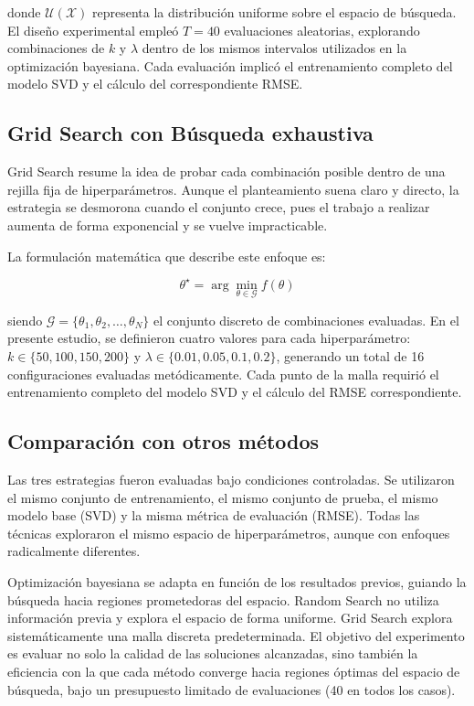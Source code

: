 \documentclass[twocolumn,10pt]{article}
\begin{document}
donde \(\mathcal{U}(\mathcal{X})\) representa la distribución uniforme sobre el espacio de búsqueda. El diseño experimental empleó \(T = 40\) evaluaciones aleatorias, explorando combinaciones de \(k\) y \(\lambda\) dentro de los mismos intervalos utilizados en la optimización bayesiana. Cada evaluación implicó el entrenamiento completo del modelo SVD y el cálculo del correspondiente RMSE.

\subsection{Grid Search con Búsqueda exhaustiva}

Grid Search resume la idea de probar cada combinación posible dentro de una rejilla fija de hiperparámetros. Aunque el planteamiento suena claro y directo, la estrategia se desmorona cuando el conjunto crece, pues el trabajo a realizar aumenta de forma exponencial y se vuelve impracticable.

La formulación matemática que describe este enfoque es:

\[
\theta^\star = \arg\min_{\theta \in \mathcal{G}} f(\theta)
\]

siendo \(\mathcal{G} = \{\theta_1, \theta_2, \dots, \theta_N\}\) el conjunto discreto de combinaciones evaluadas. En el presente estudio, se definieron cuatro valores para cada hiperparámetro: \(k \in \{50, 100, 150, 200\}\) y \(\lambda \in \{0.01, 0.05, 0.1, 0.2\}\), generando un total de 16 configuraciones evaluadas metódicamente. Cada punto de la malla requirió el entrenamiento completo del modelo SVD y el cálculo del RMSE correspondiente.

\subsection{Comparación con otros métodos}

Las tres estrategias fueron evaluadas bajo condiciones controladas. Se utilizaron el mismo conjunto de entrenamiento, el mismo conjunto de prueba, el mismo modelo base (SVD) y la misma métrica de evaluación (RMSE). Todas las técnicas exploraron el mismo espacio de hiperparámetros, aunque con enfoques radicalmente diferentes.

Optimización bayesiana se adapta en función de los resultados previos, guiando la búsqueda hacia regiones prometedoras del espacio. Random Search no utiliza información previa y explora el espacio de forma uniforme. Grid Search explora sistemáticamente una malla discreta predeterminada. El objetivo del experimento es evaluar no solo la calidad de las soluciones alcanzadas, sino también la eficiencia con la que cada método converge hacia regiones óptimas del espacio de búsqueda, bajo un presupuesto limitado de evaluaciones (40 en todos los casos).
\end{document}
